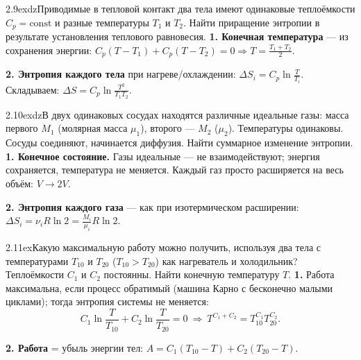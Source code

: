 \begin{problem}{2.9}{exdz}{Приводимые в тепловой контакт два тела имеют одинаковые теплоёмкости $C_p=\text{const}$ и разные температуры $T_1$ и $T_2$.
Найти приращение энтропии в результате установления теплового равновесия.}
\textbf{1. Конечная температура} — из сохранения энергии: $C_p(T-T_1)+C_p(T-T_2)=0\Rightarrow T=\frac{T_1+T_2}2$.

\textbf{2. Энтропия каждого тела} при нагреве/охлаждении: $\Delta S_i=C_p\ln\frac{T}{T_i}$. Складываем:
$\Delta S=C_p\ln\frac{T^2}{T_1T_2}$.
\end{problem}

\begin{problem}{2.10}{exdz}{В двух одинаковых сосудах находятся различные идеальные газы: масса первого $M_1$ (молярная масса $\mu_1$), второго — $M_2$ ($\mu_2$).
Температуры одинаковы. Сосуды соединяют, начинается диффузия. Найти суммарное изменение энтропии.}
\textbf{1. Конечное состояние.} Газы идеальные — не взаимодействуют; энергия сохраняется, температура не меняется.
Каждый газ просто расширяется на весь объём: $V\to2V$.

\textbf{2. Энтропия каждого газа} — как при изотермическом расширении: $\Delta S_i=\nu_iR\ln2=\frac{M_i}{\mu_i}R\ln2$.
\end{problem}

\begin{problem}{2.11}{ex}{Какую максимальную работу можно получить, используя два тела с температурами $T_{10}$ и $T_{20}$ ($T_{10}>T_{20}$) как нагреватель и холодильник?
Теплоёмкости $C_1$ и $C_2$ постоянны. Найти конечную температуру $T$.}
\textbf{1.} Работа максимальна, если процесс обратимый (машина Карно с бесконечно малыми циклами); тогда энтропия системы не меняется:
\[C_1\ln\frac{T}{T_{10}}+C_2\ln\frac{T}{T_{20}}=0\ \Rightarrow\ T^{C_1+C_2}=T_{10}^{C_1}T_{20}^{C_2}.\]

\textbf{2. Работа} = убыль энергии тел: $A=C_1(T_{10}-T)+C_2(T_{20}-T)$.
\end{problem}

